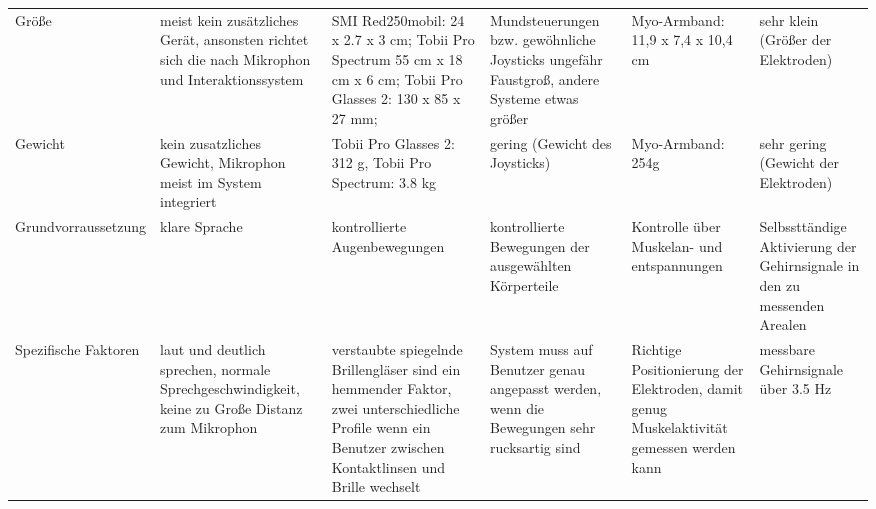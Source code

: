 \begin{landscape}
\begin{longtable}{|p{3cm}|p{3cm}|p{3cm}|p{3cm}|p{3cm}|p{3cm}|}
Größe                   & meist kein zusätzliches Gerät, ansonsten richtet sich die nach Mikrophon und Interaktionssystem & SMI Red250mobil: 24 x 2.7 x 3 cm; Tobii Pro Spectrum 55 cm x 18 cm x 6 cm; Tobii Pro Glasses 2: 130 x 85 x 27 mm;                                         & Mundsteuerungen bzw. gewöhnliche Joysticks ungefähr Faustgroß, andere Systeme etwas größer                                                 & Myo-Armband: 11,9 x 7,4 x 10,4 cm                                                        & sehr klein (Größer der Elektroden)                                       \\
Gewicht                 & kein zusatzliches Gewicht, Mikrophon meist im System integriert                                 & Tobii Pro Glasses 2:  312 g, Tobii Pro Spectrum: 3.8 kg                                                                                                   & gering (Gewicht des Joysticks)                                                                                                             & Myo-Armband: 254g                                                                        & sehr gering (Gewicht der Elektroden)                                     \\
Grundvorraussetzung     & klare Sprache                                                                                   & kontrollierte Augenbewegungen                                                                                                                             & kontrollierte Bewegungen der ausgewählten Körperteile                                                                                      & Kontrolle über Muskelan- und entspannungen                                               & Selbssttändige Aktivierung der Gehirnsignale in den zu messenden Arealen \\
Spezifische Faktoren    & laut und deutlich sprechen, normale Sprechgeschwindigkeit, keine zu Große Distanz zum Mikrophon & verstaubte spiegelnde Brillengläser sind ein hemmender Faktor, zwei unterschiedliche Profile wenn ein Benutzer zwischen Kontaktlinsen und Brille wechselt & System muss auf Benutzer genau angepasst werden, wenn die Bewegungen sehr rucksartig sind                                                  & Richtige Positionierung der Elektroden, damit genug Muskelaktivität gemessen werden kann & messbare Gehirnsignale über 3.5 Hz                                      
\label{tab:matrix} 
\end{longtable}
\end{landscape}
%
%
%
